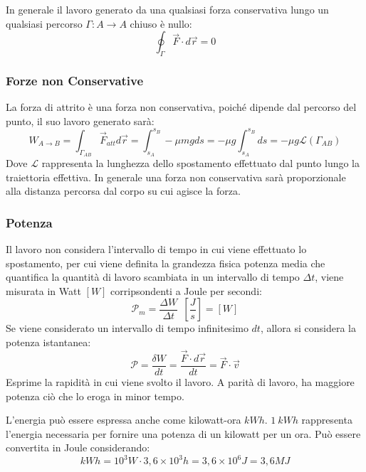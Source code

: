 \documentclass{article}
\numberwithin{equation}{subsection}
\begin{document}
In generale il lavoro generato da una qualsiasi forza conservativa lungo un qualsiasi percorso $\Gamma: A\to A $ chiuso è nullo:
\begin{equation*}
    \oint_{\Gamma}\vec{F}\cdot d\vec{r}=0
\end{equation*}

\subsubsection{Forze non Conservative}
La forza di attrito è una forza non conservativa, poiché dipende 
dal percorso del punto, il suo lavoro generato sarà:
\begin{equation}
    W_{A\to B}=\displaystyle\int_{\Gamma_{AB}}\vec{F}_{att}d\vec{r}=\int_{s_A}^{s_B}-\mu mgds=-\mu g\int_{s_A}^{s_B}ds=-\mu g\mathscr{L}(\Gamma_{AB})
\end{equation}
Dove $\mathscr{L}$ rappresenta la lunghezza dello spostamento effettuato dal punto lungo la traiettoria effettiva. In generale una forza non conservativa sarà proporzionale alla distanza percorsa dal corpo 
su cui agisce la forza. 

\subsubsection{Potenza}
Il lavoro non considera l'intervallo di tempo in cui viene effettuato 
lo spostamento, per cui viene definita la grandezza fisica potenza media 
che quantifica la quantità di lavoro scambiata in un intervallo 
di tempo $\Delta t$, viene misurata in Watt $[W]$ corripsondenti a Joule per secondi: 
\begin{equation*}
    \mathscr{P}_{m}=\displaystyle\frac{\Delta W}{\Delta t}\:\:\left[\displaystyle\frac{J}{s}\right]=[W]
\end{equation*}
Se viene considerato un intervallo di tempo infinitesimo $dt$, allora 
si considera la potenza istantanea:
\begin{equation}
    \mathscr{P}=\displaystyle\frac{\delta W}{dt}=\frac{\vec{F}\cdot d\vec{r}}{dt}=\vec{F}\cdot\vec{v}
\end{equation}
Esprime la rapidità in cui viene svolto il lavoro. A parità di lavoro, ha maggiore potenza ciò che lo eroga in minor tempo.  


L'energia può essere espressa anche come kilowatt-ora $kWh$. $1\:kWh$ rappresenta l'energia necessaria per fornire una potenza di un kilowatt per un ora. Può essere 
convertita in Joule considerando:
\begin{equation*}
    kWh=10^3W\cdot3,6\times10^3h=3,6\times10^6J=3,6MJ
\end{equation*}
\end{document}
